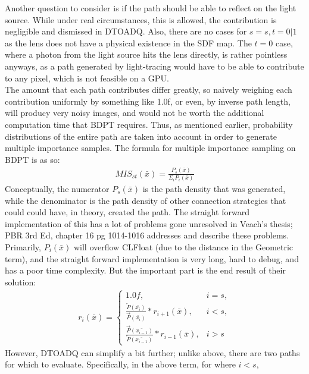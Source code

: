 \message{ !name(test.tex)}\documentclass{article}
\begin{document}
    Another question to consider is if the path should be able to reflect on the
light source. While under real circumstances, this is allowed, the contribution
is negligible and dismissed in DTOADQ. Also, there are no cases for $s = s, t =
0|1$ as the lens does not have a physical existence in the SDF map. The $t = 0$
case, where a photon from the light source hits the lens directly, is rather
pointless anyways, as a path generated by light-tracing would have to be able to
contribute to any pixel, which is not feasible on a GPU.
\\

The amount that each path contributes differ greatly, so naively weighing
each contribution uniformly by something like 1.0f, or even, by inverse path
length, will producy very noisy images, and would not be worth the additional
computation time that BDPT requires. Thus, as mentioned earlier, probability
distributions of the entire path are taken into account in order to generate
multiple importance samples.
    The formula for multiple importance sampling on BDPT is as so:
  \begin{align}
    MIS_{st}(\bar{x}) = \frac{P_s(\bar{x})}{\Sigma_i{P_i(\bar{x})}} 
  \end{align}
    Conceptually, the numerator $P_s(\bar{x})$ is the path density that was
generated, while the denominator is the path density of other connection
strategies that could could have, in theory, created the path. The
straight forward implementation of this has a lot of problems gone unresolved in
Veach's thesis; PBR 3rd Ed, chapter 16 pg 1014-1016 addresses and describe these
problems. Primarily, $P_i(\bar{x})$ will overflow CLFloat (due to the distance
in the Geometric term), and the straight forward implementation is very long,
hard to debug, and has a poor time complexity. But the important part is the end
result of their solution:
  \begin{align}
    r_i (\bar{x}) = 
    \begin{cases}
      1.0f, & i = s,\\
      \frac{\overleftarrow{P}(\bar{x_i})}{\overrightarrow{P}(\bar{x_i})} *
      r_{i+1}(\bar{x}), & i < s,\\
      \frac{\overrightarrow{P}(\bar{x_{i-1}})}{\overleftarrow{P}(\bar{x_{i-1}})}
      * r_{i-1}(\bar{x}), & i > s
    \end{cases}
  \end{align}
    However, DTOADQ can simplify a bit further; unlike above, there are two
paths for which to evaluate. Specifically, in the above term, for where $i < s$,
\end{document}
